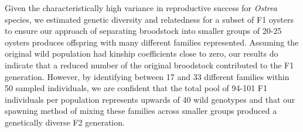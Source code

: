 \documentclass[fleqn,10pt]{wlscirep}
\begin{document}
Given the characteristically high variance in reproductive success for \textit{Ostrea} species\cite{Lallias2010-va,Launey2001-yd}, we estimated genetic diversity and relatedness for a subset of F1 oysters to ensure our approach of separating broodstock into smaller groups of 20-25 oysters produces offspring with many different families represented. Assuming the original wild population had kinship coefficients close to zero, our results do indicate that a reduced number of the original broodstock contributed to the F1 generation. However, by identifying between 17 and 33 different families within 50 sampled individuals, we are confident that the total pool of 94-101 F1 individuals per population represents upwards of 40 wild genotypes and that our spawning method of mixing these families across smaller groups produced a genetically diverse F2 generation. \par
    
\end{document}
